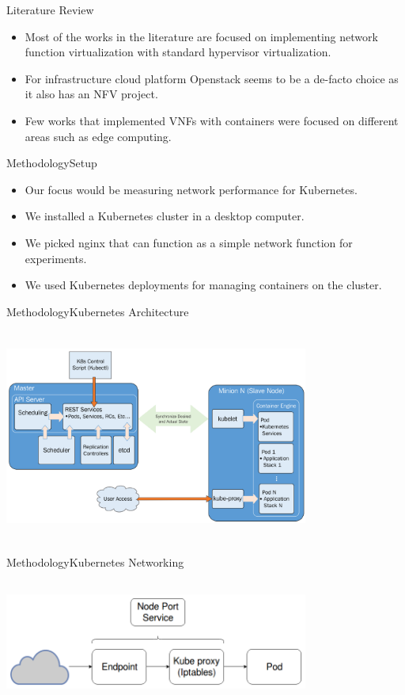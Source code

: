 \documentclass{beamer}
\begin{document}
\begin{frame}{Literature Review}
 \begin{itemize}
  \item Most of the works in the literature are focused on implementing network function virtualization with
  standard hypervisor virtualization.
  \item For infrastructure cloud platform Openstack seems to be a de-facto choice as it also has an NFV project.
  \item Few works that implemented VNFs with containers were focused on different areas such as edge computing.
 \end{itemize}

\end{frame}


\begin{frame}{Methodology}{Setup}
 \begin{itemize}
  \item Our focus would be measuring network performance for Kubernetes.
  \item We installed a Kubernetes cluster in a desktop computer.
  \item We picked nginx that can function as a simple network function for experiments.
  \item We used Kubernetes deployments for managing containers on the cluster.
 \end{itemize}
\end{frame}

\begin{frame}{Methodology}{Kubernetes Architecture}
  \begin{center}
   \includegraphics[height=7cm, width=10cm]{figures/k8s.png}
  \end{center}
\end{frame}

\begin{frame}{Methodology}{Kubernetes Networking}
  \begin{center}
   \includegraphics[height=4cm, width=10cm]{figures/conn.png}
  \end{center}
\end{frame}
\end{document}
